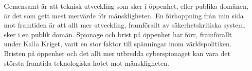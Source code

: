 \documentclass[a4paper,12pt,fleqn]{article}
\begin{document}
Gemensamt är att teknisk utveckling som sker i öppenhet, eller publika domänen, är det som gett mest mervärde för mänskligheten. En förhoppning från min sida mot framtiden är att allt mer utveckling, framförallt av säkerhetskritiska system, sker i en publik domän. Spionage och brist på öppenhet har förr, framförallt under Kalla Kriget, varit en stor faktor till spänningar inom världspolitiken. Bristen på öppenhet och det allt mer utbredda cyberspionaget kan vara det största framtida teknologiska hotet mot mänskligheten. 


\newpage
{}

\listoffootnotes
\end{document}
